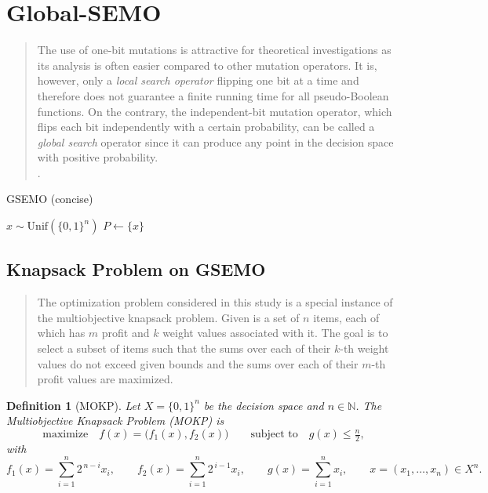 \documentclass[a4paper, 11pt]{report}
\newtheorem{definition}{Definition}
\theoremstyle{remark}
\begin{document}
\section{Global-SEMO}
    \begin{quote}
        The use of one-bit mutations is attractive for theoretical investigations as its analysis is often easier compared to other mutation operators. It
        is, however, only a \emph{local search operator} flipping one bit at a time and therefore does not guarantee a finite running time for all pseudo-Boolean
        functions. On the contrary, the independent-bit mutation operator, which flips each bit independently with a certain probability, can be called a 
        \emph{global search} operator since it can produce any point in the decision space with positive probability.\\
        \cite{laumanns2004running}.
    \end{quote}
    \begin{algorithm}[H]
        \caption{GSEMO (concise)}
        $x \sim \mathrm{Unif}(\{0,1\}^n)$\;
        $P \gets \{x\}$\;
    \end{algorithm}
\subsection{Knapsack Problem on GSEMO \cite{laumanns2004running}}
\begin{quote}
The optimization problem considered in this study is a special instance of the multiobjective knapsack problem. Given is a set of $n$ items, each 
of which has $m$ profit and $k$ weight values associated with it. The goal is to select a subset of items such that the sums over each of their 
$k$-th weight values do not exceed given bounds and the sums over each of their $m$-th profit values are maximized.
\end{quote}

\begin{definition}[MOKP]
Let $X=\{0,1\}^n$ be the decision space and $n\in\mathbb{N}$. The Multiobjective Knapsack Problem (MOKP) is
\[
\text{maximize}\quad f(x)=\bigl(f_1(x),f_2(x)\bigr)
\qquad
\text{subject to}\quad g(x)\le \tfrac{n}{2},
\]
with
\[
f_1(x)=\sum_{i=1}^{n}2^{\,n-i}x_i,\qquad
f_2(x)=\sum_{i=1}^{n}2^{\,i-1}x_i,\qquad
g(x)=\sum_{i=1}^{n}x_i,\qquad
x=(x_1,\ldots,x_n)\in X^n.
\]
\end{definition}
\end{document}
